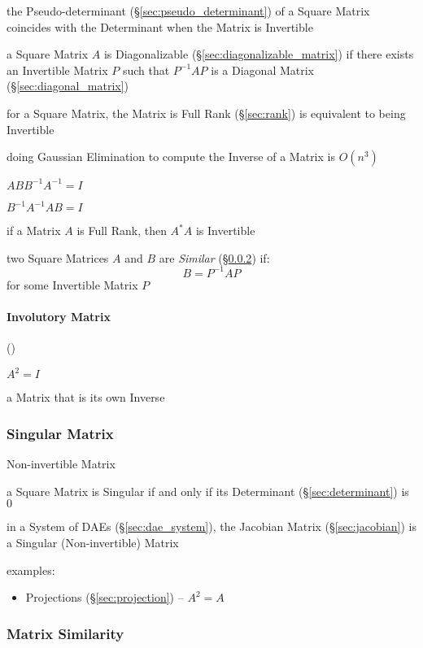the Pseudo-determinant (\S\ref{sec:pseudo_determinant}) of a Square Matrix
coincides with the Determinant when the Matrix is Invertible

a Square Matrix $A$ is Diagonalizable (\S\ref{sec:diagonalizable_matrix}) if
there exists an Invertible Matrix $P$ such that $P^{-1}AP$ is a Diagonal Matrix
(\S\ref{sec:diagonal_matrix})

for a Square Matrix, the Matrix is Full Rank (\S\ref{sec:rank}) is
equivalent to being Invertible

doing Gaussian Elimination to compute the Inverse of a Matrix is $O(n^3)$

$ABB^{-1}A^{-1} = I$

$B^{-1}A^{-1}AB = I$

if a Matrix $A$ is Full Rank, then $A^*A$ is Invertible

two Square Matrices $A$ and $B$ are \emph{Similar}
(\S\ref{sec:matrix_similarity}) if:
\[
  B = P^{-1}AP
\]
for some Invertible Matrix $P$



\paragraph{Involutory Matrix} (\label{sec:involutory_matrix})\hfill

$A^2 = I$

a Matrix that is its own Inverse



\subsubsection{Singular Matrix}\label{sec:singular_matrix}

Non-invertible Matrix

a Square Matrix is Singular if and only if its Determinant
(\S\ref{sec:determinant}) is $0$

\fist in a System of DAEs (\S\ref{sec:dae_system}), the Jacobian Matrix
(\S\ref{sec:jacobian}) is a Singular (Non-invertible) Matrix

examples:
\begin{itemize}
  \item Projections (\S\ref{sec:projection}) -- $A^2 = A$
\end{itemize}



\subsubsection{Matrix Similarity}\label{sec:matrix_similarity}

